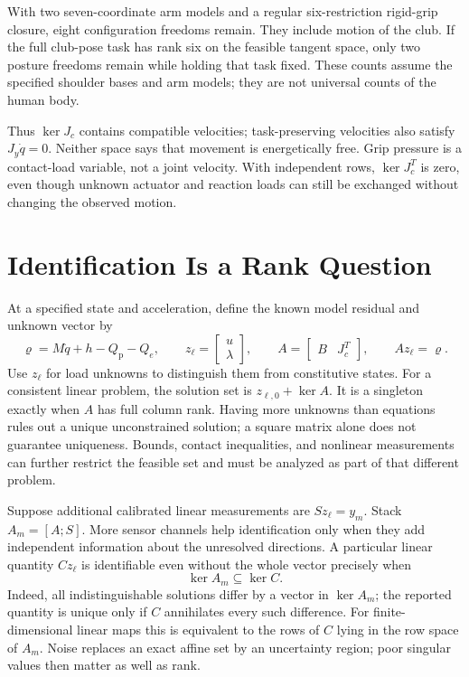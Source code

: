 With two seven-coordinate arm models and a regular six-restriction rigid-grip
closure, eight configuration freedoms remain. They include motion of the club.
If the full club-pose task has rank six on the feasible tangent space, only two
posture freedoms remain while holding that task fixed. These counts assume the
specified shoulder bases and arm models; they are not universal counts of the
human body.

Thus $\ker J_c$ contains compatible velocities; task-preserving velocities also
satisfy $J_y\dot q=0$. Neither space says that movement is energetically free.
Grip pressure is a contact-load variable, not a joint velocity. With independent
rows, $\ker J_c^T$ is zero, even though unknown actuator and reaction loads can
still be exchanged without changing the observed motion.

\section{Identification Is a Rank Question}
\label{sec:identifiable}

At a specified state and acceleration, define the known model residual and
unknown vector by
\begin{equation}
 \varrho=M\ddot q+h-Q_{\mathrm{p}}-Q_e,\qquad
 z_\ell=\begin{bmatrix}u\\\lambda\end{bmatrix},\qquad
 A=\begin{bmatrix}B&J_c^T\end{bmatrix},\qquad Az_\ell=\varrho.
 \label{eq:inverse_underdetermined_formal}
\end{equation}
Use $z_\ell$ for load unknowns to distinguish them from constitutive states.
For a consistent linear problem, the solution set is $z_{\ell,0}+\ker A$.
It is a singleton exactly when $A$ has full column rank. Having more unknowns
than equations rules out a unique unconstrained solution; a square matrix alone
does not guarantee uniqueness. Bounds, contact inequalities, and nonlinear
measurements can further restrict the feasible set and must be analyzed as part
of that different problem.

Suppose additional calibrated linear measurements are $Sz_\ell=y_m$. Stack
$A_m=[A;S]$. More sensor channels help identification only when they add
independent information about the unresolved directions. A particular linear
quantity $Cz_\ell$ is identifiable even without the whole vector precisely when
\begin{equation}
 \ker A_m\subseteq\ker C.
 \label{eq:quantity_identification}
\end{equation}
Indeed, all indistinguishable solutions differ by a vector in $\ker A_m$;
the reported quantity is unique only if $C$ annihilates every such difference.
For finite-dimensional linear maps this is equivalent to the rows of $C$ lying
in the row space of $A_m$. Noise replaces an exact affine set by an uncertainty
region; poor singular values then matter as well as rank.

